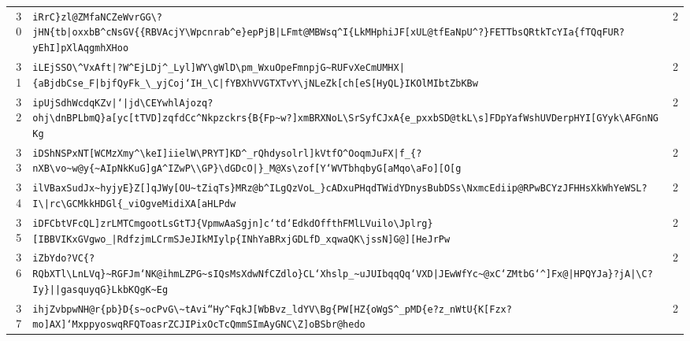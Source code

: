 \begin{xltabular}{\textwidth}{@{} r >{\raggedright\arraybackslash}X r @{}}
        30 & \texttt{iRrC\}zl@ZMfaNCZeWvrGG\textbackslash{}?jHN\{tb|oxxbB\textasciicircum{}cNsGV\{\{RBVAcjY\textbackslash{}Wpcnrab\textasciicircum{}e\}epPjB|LFmt@MBWsq\textasciicircum{}I\{LkMHphiJF[xUL@tfEaNpU\textasciicircum{}?\}FETTbsQRtkTcYIa\{fTQqFUR?yEhI]pXlAqgmhXHoo} & 2 \\
        31 & \texttt{iLEjSSO\textbackslash{}\textasciicircum{}VxAft|?W\textasciicircum{}EjLDj\textasciicircum{}\_Lyl]WY\textbackslash{}gWlD\textbackslash{}pm\_WxuOpeFmnpjG\textasciitilde{}RUFvXeCmUMHX|\{aBjdbCse\_F|bjfQyFk\_\textbackslash{}\_yjCoj`IH\_\textbackslash{}C|fYBXhVVGTXTvY\textbackslash{}jNLeZk[ch[eS[HyQL\}IKOlMIbtZbKBw} & 2 \\
        32 & \texttt{ipUjSdhWcdqKZv|`|jd\textbackslash{}CEYwhlAjozq?ohj\textbackslash{}dnBPLbmQ\}a[yc[tTVD]zqfdCc\textasciicircum{}Nkpzckrs\{B\{Fp\textasciitilde{}w?]xmBRXNoL\textbackslash{}SrSyfCJxA\{e\_pxxbSD@tkL\textbackslash{}s]FDpYafWshUVDerpHYI[GYyk\textbackslash{}AFGnNGKg} & 2 \\
        33 & \texttt{iDShNSPxNT[WCMzXmy\textasciicircum{}\textbackslash{}keI]iielW\textbackslash{}PRYT]KD\textasciicircum{}\_rQhdysolrl]kVtfO\textasciicircum{}OoqmJuFX|f\_\{?nXB\textbackslash{}vo\textasciitilde{}w@y\{\textasciitilde{}AIpNkKuG]gA\textasciicircum{}IZwP\textbackslash{}\textbackslash{}GP\}\textbackslash{}dGDcO|\}\_M@Xs\textbackslash{}zof[Y`WVTbhqbyG[aMqo\textbackslash{}aFo][O[g} & 2 \\
        34 & \texttt{ilVBaxSudJx\textasciitilde{}hyjyE\}Z[]qJWy[OU\textasciitilde{}tZiqTs\}MRz@b\textasciicircum{}ILgQzVoL\_\}cADxuPHqdTWidYDnysBubDSs\textbackslash{}NxmcEdiip@RPwBCYzJFHHsXkWhYeWSL?I\textbackslash{}|rc\textbackslash{}GCMkkHDGl\{\_viOgveMidiXA[aHLPdw} & 2 \\
        35 & \texttt{iDFCbtVFcQL]zrLMTCmgootLsGtTJ\{VpmwAaSgjn]c`td`EdkdOffthFMlLVuilo\textbackslash{}Jplrg\}[IBBVIKxGVgwo\_|RdfzjmLCrmSJeJIkMIylp\{INhYaBRxjGDLfD\_xqwaQK\textbackslash{}jssN]G@][HeJrPw} & 2 \\
        36 & \texttt{iZbYdo?VC\{?RQbXTl\textbackslash{}LnLVq\}\textasciitilde{}RGFJm`NK@ihmLZPG\textasciitilde{}sIQsMsXdwNfCZdlo\}CL`Xhslp\_\textasciitilde{}uJUIbqqQq`VXD|JEwWfYc\textasciitilde{}@xC`ZMtbG`\textasciicircum{}]Fx@|HPQYJa\}?jA|\textbackslash{}C?Iy\}||gasquyqG\}LkbKQgK\textasciitilde{}Eg} & 2 \\
        37 & \texttt{ihjZvbpwNH@r\{pb\}D\{s\textasciitilde{}ocPvG\textbackslash{}\textasciitilde{}tAvi``Hy\textasciicircum{}FqkJ[WbBvz\_ldYV\textbackslash{}Bg\{PW[HZ\{oWgS\textasciicircum{}\_pMD\{e?z\_nWtU\{K[Fzx?mo]AX]`MxppyoswqRFQToasrZCJIPixOcTcQmmSImAyGNC\textbackslash{}Z]oBSbr@hedo} & 2 \\

\end{xltabular}
